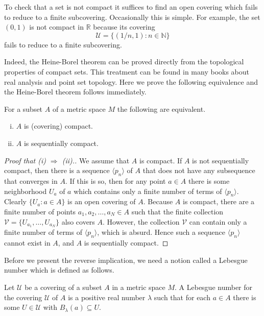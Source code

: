 To check that a set is not compact it suffices to find an open covering which fails to reduce to a finite subcovering. 
Occasionally this is simple.
For example, the set $(0,1)$ is not compact in $\mathbb{R}$ because its covering
\[
  \mathcal{U} = \{ (1/n, 1) \colon n \in \mathbb{N} \}
\]
fails to reduce to a finite subcovering.

Indeed, the Heine-Borel theorem can be proved directly from the topological properties of compact sets.
This treatment can be found in many books about real analysis and point set topology.
Here we prove the following equivalence and the Heine-Borel theorem follows immediately.

\begin{thm}
  \label{thm:cpt}
  For a subset $A$ of a metric space $M$ the following are equivalent.
  \begin{enumerate}[(i)]
    \item $A$ is (covering) compact.
    \item $A$ is sequentially compact.
  \end{enumerate}
\end{thm}

\begin{proof}[Proof that (i) $\Rightarrow$ (ii).]
  We assume that $A$ is compact.
  If $A$ is not sequentially compact, then there is a sequence $\langle p_n \rangle$ of $A$ that does not have any subsequence that converges in $A$.
  If this is so, then for any point $a \in A$ there is some neighborhood $U_a$ of $a$ which contains only a finite number of terms of $\langle p_n \rangle$.
  Clearly $\{ U_a \colon a \in A \}$ is an open covering of $A$.
  Because $A$ is compact, there are a finite number of points $a_1, a_2, \dots, a_N \in A$ such that the finite collection $\mathcal{V} = \{ U_{a_1}, \dots, U_{a_N} \}$ also covers $A$.
  However, the collection $\mathcal{V}$ can contain only a finite number of terms of $\langle p_n \rangle$, which is absurd.
  Hence such a sequence $\langle p_n \rangle$ cannot exist in $A$, and $A$ is sequentially compact.
\end{proof}

Before we present the reverse implication, we need a notion called a Lebesgue number which is defined as follows.

\begin{defn}
  Let $\mathcal{U}$ be a covering of a subset $A$ in a metric space $M$.
  A \textsf{Lebesgue number} for the covering $\mathcal{U}$ of $A$ is a positive real number $\lambda$ such that for each $a \in A$ there is some $U \in \mathcal{U}$ with $B_\lambda(a) \subseteq U$.
\end{defn}

